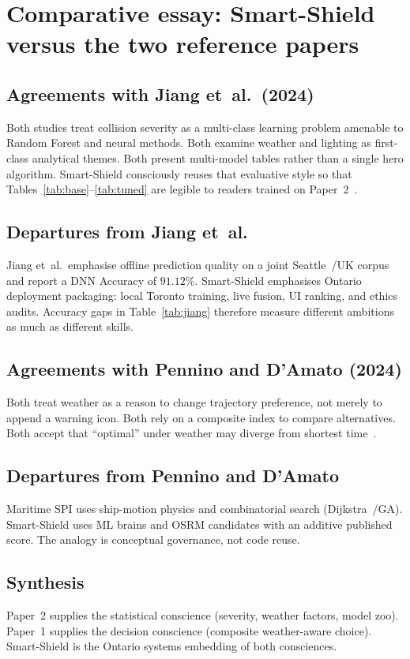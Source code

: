 \documentclass[11pt,a4paper]{article}
\begin{document}
\newpage
\section*{Comparative essay: Smart-Shield versus the two reference papers}
\label{sec:compare}

\subsection{Agreements with Jiang et~al.\ (2024)}
Both studies treat collision severity as a multi-class learning problem amenable to Random Forest and neural methods. Both examine weather and lighting as first-class analytical themes. Both present multi-model tables rather than a single hero algorithm. Smart-Shield consciously reuses that evaluative style so that Tables~\ref{tab:base}--\ref{tab:tuned} are legible to readers trained on Paper~2~\citep{jiang2024traffic}.

\subsection{Departures from Jiang et~al.}
Jiang et~al.\ emphasise offline prediction quality on a joint Seattle~/UK corpus and report a DNN Accuracy of $91.12\%$. Smart-Shield emphasises Ontario deployment packaging: local Toronto training, live fusion, UI ranking, and ethics audits. Accuracy gaps in Table~\ref{tab:jiang} therefore measure different ambitions as much as different skills.

\subsection{Agreements with Pennino and D'Amato (2024)}
Both treat weather as a reason to change trajectory preference, not merely to append a warning icon. Both rely on a composite index to compare alternatives. Both accept that ``optimal'' under weather may diverge from shortest time~\citep{pennino2024weather}.

\subsection{Departures from Pennino and D'Amato}
Maritime SPI uses ship-motion physics and combinatorial search (Dijkstra~/GA). Smart-Shield uses ML brains and OSRM candidates with an additive published score. The analogy is conceptual governance, not code reuse.

\subsection{Synthesis}
Paper~2 supplies the statistical conscience (severity, weather factors, model zoo). Paper~1 supplies the decision conscience (composite weather-aware choice). Smart-Shield is the Ontario systems embedding of both consciences.
\end{document}
